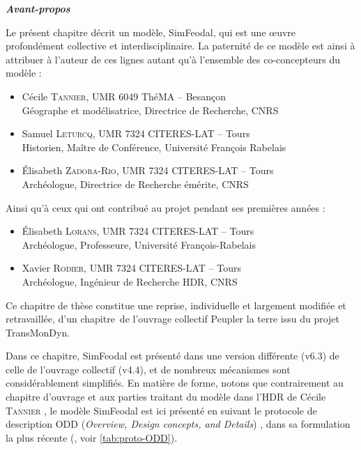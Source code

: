 \begin{mdframed}[backgroundcolor=black!5,footnoteinside=false]
\textbf{\hypertarget{avant-propos}{\textit{Avant-propos}}}

Le présent chapitre décrit un modèle, SimFeodal, qui est une œuvre profondément collective et interdisciplinaire.
La paternité de ce modèle est ainsi à attribuer à l'auteur de ces lignes autant qu'à l'ensemble des co-concepteurs du modèle :
\begin{itemize}
	\item Cécile \textsc{Tannier}, UMR 6049 ThéMA -- Besançon\\
	Géographe et modélisatrice, Directrice de Recherche, CNRS
	\item Samuel \textsc{Leturcq}, UMR 7324 CITERES-LAT -- Tours\\
	Historien, Maître de Conférence, Université François Rabelais
	\item Élisabeth \textsc{Zadora-Rio}, UMR 7324 CITERES-LAT -- Tours\\
	Archéologue, Directrice de Recherche émérite, CNRS
\end{itemize}
Ainsi qu'à ceux qui ont contribué au projet pendant ses premières années :
\begin{itemize}
	\item Élisabeth \textsc{Lorans}, UMR 7324 CITERES-LAT -- Tours\\
	Archéologue, Professeure, Université François-Rabelais
	\item Xavier \textsc{Rodier}, UMR 7324 CITERES-LAT -- Tours\\
	Archéologue, Ingénieur de Recherche HDR, CNRS
\end{itemize}
Ce chapitre de thèse constitue une reprise, individuelle et largement modifiée et retravaillée, d'un chapitre\footnotemark{}~de l'ouvrage collectif \og Peupler la terre\fg{} \autocite{sanders2018peupler} issu du projet TransMonDyn\footnotemark.

Dans ce chapitre, SimFeodal est présenté dans une version différente (v6.3) de celle de l'ouvrage collectif (v4.4), et de nombreux mécanismes sont considérablement simplifiés.
En matière de forme, notons que contrairement au chapitre d'ouvrage et aux parties traitant du modèle dans l'HDR de Cécile \textsc{Tannier} \autocite{tannier_analyse_2017}, le modèle SimFeodal est ici présenté en suivant le protocole de description \og ODD\fg{} (\textit{Overview, Design concepts, and Details}) \autocite{grimm_odd_2010}, dans sa formulation la plus récente (\cite{grimm_documenting_2017}, voir \cref{tab:proto-ODD}).


\end{mdframed}
